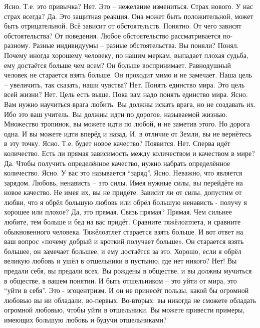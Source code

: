 \documentclass{extbook}
\newcommand{\soul}[1]{{#1}}
\newcommand{\people}[1]{{#1}}
\begin{document}
\people{Ясно. Т.е. это привычка?}
\soul{Нет. Это – нежелание измениться. Страх нового.}
\people{У  нас страх всегда?}
\soul{Да. Это защитная реакция. Она может быть положительной, может быть отрицательной. Всё зависит от обстоятельств.}
\people{Понятно. От чего зависят обстоятельства?}
\soul{От поведения. Любое обстоятельство рассматривается по-разному. Разные  индивидуумы  –
  разные обстоятельства. Вы поняли?}
\people{Понял. Почему иногда хорошему человеку, по нашим меркам, выпадает плохая судьба, ему достаётся больше чем всем?}
\soul{Он больше воспринимает. Равнодушный человек не старается взять больше. Он проходит мимо и не замечает.}
\people{Наша цель – увеличить, так сказать, наши чувства?}
\soul{Нет. Понять единство мира.}
\people{Это цель всей жизни?}
\soul{Нет. Цель есть выше. Пока вам надо понять единство мира.}
\people{Ясно.}
\soul{Вам нужно научиться врага  любить. Вы должны искать врага, но не создавать их. Ибо это ваш учитель. Вы должны идти по дорогое, называемой жизнью. Множество тропинок, вы можете идти по любой, и не заметив этого. Но дорога одна. И вы можете идти  вперёд и назад.  И, в отличие от Земли, вы не вернётесь в эту точку.}
\people{Ясно.  Т.е. будет новое качество? Появится.}
\soul{Нет. Сперва  идёт количество.}
\people{Есть ли прямая зависимость между количеством и качеством в мире?}
\soul{Да. Чтобы получить определённое качество, нужно набрать определённое количество.}
\people{Ясно.}
\soul{У вас это называется ``заряд''.}
\people{Ясно.}
\soul{Неважно, что является зарядом. Любовь, ненависть – это силы. Имея нужные силы, вы перейдёте на новое качество. Не имея их, вы не придёте.}
\people{Зависит ли от силы, допустим от любви, что я обрёл большую любовь или обрёл большую ненависть - получу я хорошее или плохое?}
\soul{Да, это прямая.}
\people{Связь прямая?}
\soul{Прямая. Чем сильнее любите, тем больше и бед на вас придёт. Cравните  тяжёлоатлета, и сравните обыкновенного человека. Тяжёлоатлет старается взять больше. И вот ответ на ваш вопрос «почему добрый и кроткий  получает больше». Он старается взять большее, он замечает большее, и ему достаётся за это.}
\people{Хорошо, если я обрёл великую любовь и ушёл в отшельники в пустыню, где нет никого?}
\soul{Нет! Вы предали себя, вы предали всех. Вы рождены в обществе, и вы должны мучиться в обществе, в вашем понятии. И быть отшельником – это уйти от мира, это ``уйти в себя''. Это - эгоцентризм. И он не принесёт пользы, какой бы огромной любовью вы ни обладали, во-первых. Во-вторых: вы никогда не сможете обладать огромной любовью, чтобы уйти в отшельники. Вы можете привести примеры,  имеющих большую любовь и будучи отшельниками?}
\end{document}
